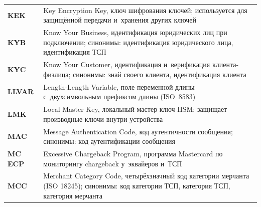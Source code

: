 \begin{longtable}{@{}p{4.5em}p{\dimexpr\linewidth-4.5em-2\tabcolsep\relax}@{}}
  \textbf{KEK}               & Key Encryption Key, ключ шифрования ключей; используется для защищённой передачи и~хранения других ключей                                                                                                                                                                                        \\
  \textbf{KYB}               & Know Your Business, идентификация юридических лиц при подключении; синонимы: идентификация юридического лица, идентификация ТСП                                                                                                                                                                  \\
  \textbf{KYC}               & Know Your Customer, идентификация и~верификация клиента-физлица; синонимы: знай своего клиента, идентификация клиента                                                                                                                                                                            \\
  \textbf{LLVAR}             & Length-Length Variable, поле переменной длины с~двухсимвольным префиксом длины (ISO~8583)                                                                                                                                                                                                        \\
  \textbf{LMK}               & Local Master Key, локальный мастер-ключ HSM; защищает производные ключи внутри устройства                                                                                                                                                                                                        \\
  \textbf{MAC}               & Message Authentication Code, код аутентичности сообщения; синонимы: код аутентификации сообщения                                                                                                                                                                                                 \\
  \textbf{MC ECP}            & Excessive Chargeback Program, программа Mastercard по мониторингу chargeback у~эквайеров и~ТСП                                                                                                                                                                                          \\
  \textbf{MCC}               & Merchant Category Code, четырёхзначный код категории мерчанта (ISO 18245); синонимы: код категории ТСП, категория ТСП, категория мерчанта                                                                                                                                                         \\

\end{longtable}
